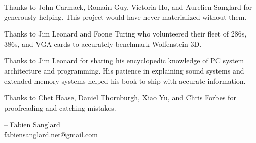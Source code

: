 Thanks to John Carmack, Romain Guy, Victoria Ho, and Aurelien Sanglard for generously helping. This project would have never
materialized without them.\\ 
\par
Thanks to  Jim Leonard and Foone Turing who volunteered their fleet of 286s, 386s, and VGA cards to accurately benchmark Wolfenstein 3D.\\
\par
Thanks to  Jim Leonard for sharing his encyclopedic knowledge of PC system architecture and programming. His patience in explaining sound systems and extended memory systems helped his book to ship with accurate information.\\
\par
Thanks to  Chet Haase, Daniel Thornburgh, Xiao Yu, and Chris Forbes for proofreading and catching mistakes.\\
\par
-- Fabien Sanglard\\
fabiensanglard.net@gmail.com
